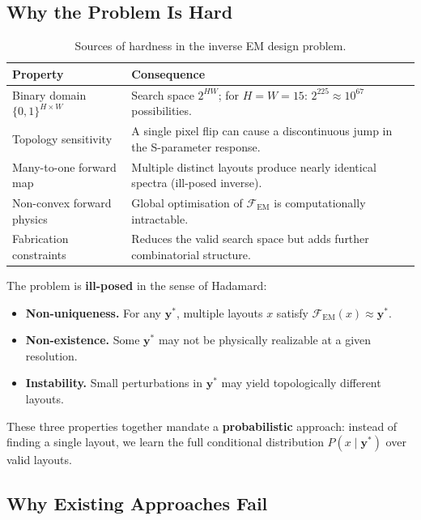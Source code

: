 \documentclass[12pt,a4paper]{article}
\newcommand{\FEM}{\mathcal{F}_{\mathrm{EM}}}
\newcommand{\ystar}{\mathbf{y}^{*}}
\newcommand{\HW}{H \times W}
\theoremstyle{definition}
\theoremstyle{plain}
\theoremstyle{remark}
\begin{document}
\subsection{Why the Problem Is Hard}
\label{sec:problem:hard}

\begin{table}[H]
\centering
\caption{Sources of hardness in the inverse EM design problem.}
\label{tab:hardness}
\begin{tabular}{lp{7.5cm}}
\toprule
\textbf{Property} & \textbf{Consequence} \\
\midrule
Binary domain $\{0,1\}^{\HW}$ &
  Search space $2^{HW}$; for $H=W=15$: $2^{225} \approx 10^{67}$ possibilities. \\
\addlinespace
Topology sensitivity &
  A single pixel flip can cause a discontinuous jump in the S-parameter response. \\
\addlinespace
Many-to-one forward map &
  Multiple distinct layouts produce nearly identical spectra (ill-posed inverse). \\
\addlinespace
Non-convex forward physics &
  Global optimisation of $\FEM$ is computationally intractable. \\
\addlinespace
Fabrication constraints &
  Reduces the valid search space but adds further combinatorial structure. \\
\bottomrule
\end{tabular}
\end{table}

The problem is \textbf{ill-posed} in the sense of Hadamard:
\begin{itemize}
  \item \textbf{Non-uniqueness.}  For any $\ystar$, multiple layouts $x$ satisfy
        $\FEM(x) \approx \ystar$.
  \item \textbf{Non-existence.}  Some $\ystar$ may not be physically realizable at a
        given resolution.
  \item \textbf{Instability.}  Small perturbations in $\ystar$ may yield topologically
        different layouts.
\end{itemize}

These three properties together mandate a \textbf{probabilistic} approach: instead of
finding a single layout, we learn the full conditional distribution
$P(x \mid \ystar)$ over valid layouts.

\subsection{Why Existing Approaches Fail}
\label{sec:problem:existing}
\end{document}
